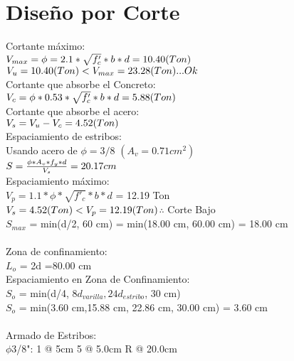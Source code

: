 \documentclass{article}%
\begin{document}
%
\section{Diseño por Corte}%
\label{sec:DiseoporCorte}%
Cortante máximo: \\$ V_{max} = \phi=2.1*\sqrt{f'_{c}}*b*d = 10.40(Ton) \\ $$ V_{u} = 10.40 (Ton) < V_{max} = 23.28 (Ton) ... Ok \\$\\ Cortante que absorbe el Concreto: \\$ V_{c}=\phi*0.53*\sqrt{f'_{c}}*b*d = 5.88(Ton) \\$\\Cortante que absorbe el acero:\\ $ V_{s} = V_{u} - V_{c} = 4.52(Ton) \\$\\ Espaciamiento de estribos: \\ Usando acero de $\phi = 3/8$  $(A_{v} = 0.71 cm^{2}) $\\$ S = \frac{\phi*A_{v}*f_{y}*d}{V_{s}} = 20.17 cm \\$\\ Espaciamiento máximo: \\$ V_p = 1.1*\phi*\sqrt{f'_{c}}*b*d $ = 12.19 Ton\\$ V_{s} = 4.52 (Ton) < V_{p} = 12.19 (Ton) \\$$\therefore$ Corte Bajo \\$ S_{max} $ = min(d/2, 60 cm) = min(18.00 cm, 60.00 cm) = 18.00 cm \\ \\ Zona de confinamiento: \\$L_{o}$ = 2d =80.00 cm \\Espaciamiento en Zona de Confinamiento: \\$S_{o}$ = min(d/4, $8d_{varilla}, 24d_{estribo}$, 30 cm) \\$S_{o}$ = min(3.60 cm,15.88 cm, 22.86 cm, 30.00 cm) = 3.60 cm \\ \\ Armado de Estribos: \\$\phi$3/8": 1 @ 5cm 5 @ 5.0cm R @ 20.0cm 

%
\end{document}
